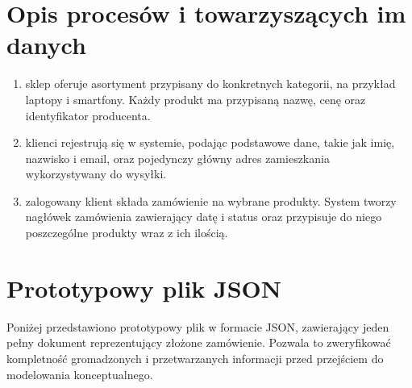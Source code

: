 \documentclass[letterpaper,10pt,polish]{sphinxmanual}
\begin{document}
\section{Opis procesów i towarzyszących im danych}
\label{\detokenize{rozdzial_3/index:opis-procesow-i-towarzyszacych-im-danych}}\begin{enumerate}
%
\item {} 
\sphinxAtStartPar
{} sklep oferuje asortyment przypisany do konkretnych kategorii, na przykład laptopy i smartfony. Każdy produkt ma przypisaną nazwę, cenę oraz identyfikator producenta.

\item {} 
\sphinxAtStartPar
{} klienci rejestrują się w systemie, podając podstawowe dane, takie jak imię, nazwisko i e\sphinxhyphen{}mail, oraz pojedynczy główny adres zamieszkania wykorzystywany do wysyłki.

\item {} 
\sphinxAtStartPar
{} zalogowany klient składa zamówienie na wybrane produkty. System tworzy nagłówek zamówienia zawierający datę i status oraz przypisuje do niego poszczególne produkty wraz z ich ilością.

\end{enumerate}


\section{Prototypowy plik JSON}
\label{\detokenize{rozdzial_3/index:prototypowy-plik-json}}
\sphinxAtStartPar
Poniżej przedstawiono prototypowy plik w formacie JSON, zawierający jeden pełny dokument reprezentujący złożone zamówienie. Pozwala to zweryfikować kompletność gromadzonych i przetwarzanych informacji przed przejściem do modelowania konceptualnego.
\end{document}
